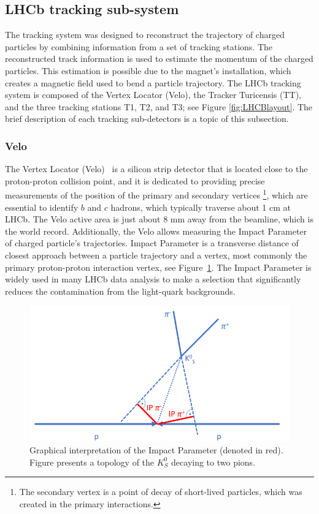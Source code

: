 \subsection{LHCb tracking sub-system}
\label{sec:lhcb_tracking_subsystem}
The tracking system was designed to reconstruct the trajectory of charged particles by combining information from a set of tracking stations. The reconstructed track information is used to estimate the momentum of the charged particles. This estimation is possible due to the magnet's installation, which creates a magnetic field used to bend a particle trajectory. The LHCb tracking system is composed of the Vertex Locator (Velo), the Tracker Turicensis (TT), and the three tracking stations T1, T2, and T3; see Figure \ref{fig:LHCBlayout}.  The brief description of each tracking sub-detectors is a topic of this subsection. 

\subsubsection{Velo}
\label{sec:velo}
The Vertex Locator (Velo)~\cite{VELO} is a silicon strip detector that is located close to the proton-proton collision point, and it is dedicated to providing precise measurements of the position of the primary and secondary vertices \footnote{The secondary vertex is a point of decay of short-lived particles, which was created in the primary interactions. }, which are essential to identify $b$ and $c$ hadrons, which typically traverse about 1 cm at LHCb.  
The Velo active area is just about 8 mm away from the beamline, which is the world record. Additionally, the Velo allows measuring the Impact Parameter of charged particle's trajectories. Impact Parameter is a transverse distance of closest approach between a particle trajectory and a vertex, most commonly the primary proton-proton interaction vertex, see Figure~\ref{fig:IP}. The Impact Parameter is widely used in many LHCb data analysis to make a selection that significantly reduces the contamination from the light-quark backgrounds.  


\begin{figure}[h]
\centering
\includegraphics{figures/IP.PNG}
\caption{Graphical interpretation of the Impact Parameter (denoted in red). Figure presents a topology of the $K_S^0$ decaying to two pions.  
\label{fig:IP}}
\end{figure}

